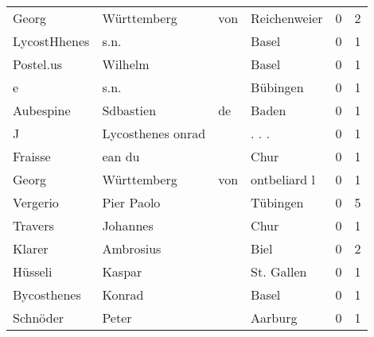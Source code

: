 \begin{tabular}{llllrr}
                    Georg &                        Württemberg &         von &                                Reichenweier &          0 &         2 \\
             LycostHhenes &                               s.n. &             &                                       Basel &          0 &         1 \\
                Postel.us &                            Wilhelm &             &                                       Basel &          0 &         1 \\
                        e &                               s.n. &             &                                    Bübingen &          0 &         1 \\
                Aubespine &                          Sdbastien &          de &                                       Baden &          0 &         1 \\
                        J &                  Lycosthenes onrad &             &                                      . . .  &          0 &         1 \\
                  Fraisse &                             ean du &             &                                        Chur &          0 &         1 \\
                    Georg &                        Württemberg &         von &                                ontbeliard l &          0 &         1 \\
                 Vergerio &                         Pier Paolo &             &                                    Tübingen &          0 &         5 \\
                  Travers &                           Johannes &             &                                        Chur &          0 &         1 \\
                   Klarer &                          Ambrosius &             &                                        Biel &          0 &         2 \\
                  Hüsseli &                             Kaspar &             &                                  St. Gallen &          0 &         1 \\
              Bycosthenes &                             Konrad &             &                                       Basel &          0 &         1 \\
                 Schnöder &                              Peter &             &                                     Aarburg &          0 &         1 \\

\end{tabular}
